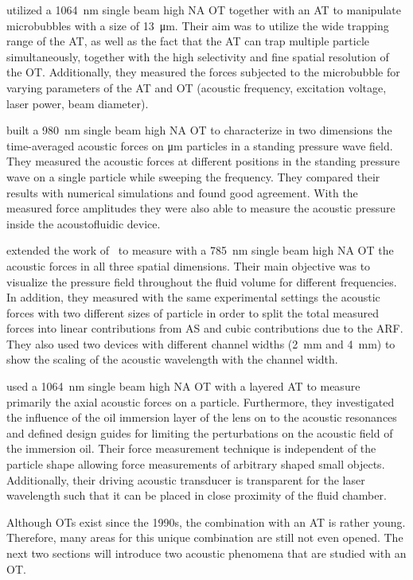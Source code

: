  utilized a \SI{1064}{\nm} single beam high NA OT together with 
an AT to manipulate microbubbles with a size of \SI{13}{\um}. Their aim was to 
utilize the wide trapping range of the AT, as well as the fact that the AT can 
trap multiple particle simultaneously, together with the high selectivity and 
fine spatial resolution of the OT. Additionally, they measured the forces 
subjected to the microbubble for varying parameters of the AT and OT (acoustic 
frequency, excitation voltage, laser power, beam diameter).

 built a \SI{980}{\nm} single beam high NA OT to 
characterize in two dimensions the time-averaged acoustic forces on \si{\um} 
particles in a standing pressure wave field. They measured the acoustic forces 
at different positions in the standing pressure wave on a single particle while 
sweeping the frequency. They compared their results with numerical simulations 
and found good agreement. With the measured force amplitudes they were also 
able to measure the acoustic pressure inside the acoustofluidic device.

 extended the work of~ to measure 
with a \SI{785}{\nm} single beam high NA OT the acoustic forces in all three 
spatial dimensions. Their main objective was to visualize the pressure field 
throughout the fluid volume for different frequencies. In addition, they 
measured with the same experimental settings the acoustic forces with two 
different sizes of particle in order to split the total measured forces into 
linear contributions from AS and cubic contributions due to the ARF. They also 
used two devices with different channel widths (\SI{2}{\mm} and \SI{4}{\mm}) to 
show the scaling of the acoustic wavelength with the channel width.

 used a \SI{1064}{\nm} single beam high NA OT with a 
layered AT to measure primarily the axial acoustic forces on a particle. 
Furthermore, they investigated the influence of the oil immersion layer of the 
lens on to the acoustic resonances and defined design guides for limiting the 
perturbations on the acoustic field of the immersion oil. Their force 
measurement technique is independent of the particle shape allowing force 
measurements of arbitrary shaped small objects. Additionally, their driving 
acoustic transducer is transparent for the laser wavelength such that it can be 
placed in close proximity of the fluid chamber.

Although OTs exist since the 1990s, the combination with an AT is rather young. 
Therefore, many areas for this unique combination are still not even opened. 
The next two sections will introduce two acoustic phenomena that are studied 
with an OT.

